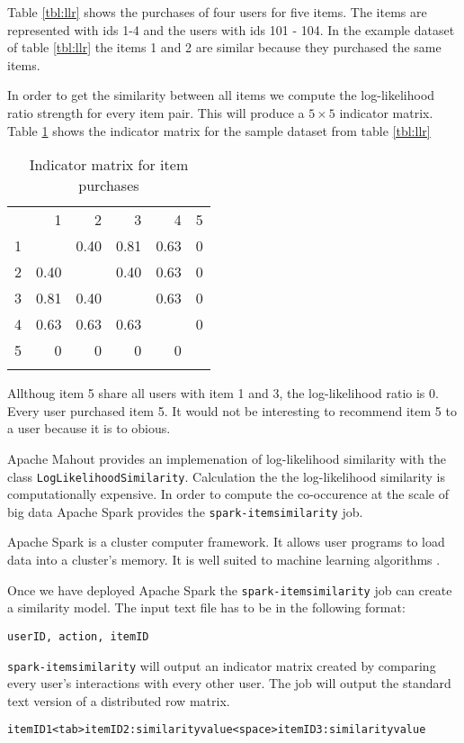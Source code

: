 Table \ref{tbl:llr} shows the purchases of four users for five items. The items are represented with ids 1-4 and the users with ids 101 - 104.
In the example dataset of table \ref{tbl:llr} the items 1 and 2 are similar because they purchased the same items. 

In order to get the similarity between all items we compute the log-likelihood ratio strength for every item pair. This will produce a $5 \times 5$ indicator matrix. Table \ref{tab:indicatormatrix} shows the indicator matrix for the sample dataset from table \ref{tbl:llr}

\begin{table}
  \centering
\begin{center}
\begin{tabular}{rrrrrr}
 & 1 & 2 & 3 & 4 & 5\\
1 &  & 0.40 & 0.81 & 0.63 & 0\\
2 & 0.40 &  & 0.40 & 0.63 & 0\\
3 & 0.81 & 0.40 &  & 0.63 & 0\\
4 & 0.63 & 0.63 & 0.63 &  & 0\\
5 & 0 & 0 & 0 & 0 & \\
 &  &  &  &  & \\
\end{tabular}
\end{center}
  \caption{Indicator matrix for item purchases}
  \label{tab:indicatormatrix}
\end{table}


Allthoug item 5 share all users with item 1 and 3, the log-likelihood ratio is 0. Every user purchased item 5. It would not be interesting to recommend item 5 to a user because it is to obious.

Apache Mahout provides an implemenation of log-likelihood similarity with the class \verb|LogLikelihoodSimilarity|. Calculation the the log-likelihood similarity is computationally expensive. In order to compute the co-occurence at the scale of big data Apache Spark provides the \verb|spark-itemsimilarity| job. 

Apache Spark is a cluster computer framework. It allows user programs to load data into a cluster's memory. It is well suited to machine learning algorithms \cite{Karau}.

Once we have deployed Apache Spark the \verb|spark-itemsimilarity| job can create a similarity model. The input text file has to be in the following format:
\begin{verbatim}
userID, action, itemID
\end{verbatim}
\verb|spark-itemsimilarity| will output an indicator matrix created by comparing every user's interactions with every other user. The job will output the standard text version of a distributed row matrix.
\begin{verbatim}
itemID1<tab>itemID2:similarityvalue<space>itemID3:similarityvalue
\end{verbatim}

